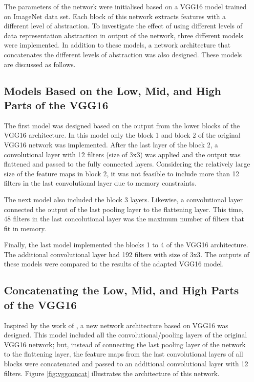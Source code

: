 The parameters of the network were initialised based on a VGG16 model trained on ImageNet data set. Each block of this network extracts features with a different level of abstraction. To investigate the effect of using different levels of data representation abstraction in output of the network, three different models were implemented. In addition to these models, a network architecture that concatenates the different levels of abstraction was also designed. These models are discussed as follows.

\subsection{Models Based on the Low, Mid, and High Parts of the VGG16}

The first model was designed based on the output from the lower blocks of the VGG16 architecture. In this model only the block 1 and block 2 of the original VGG16 network was implemented. After the last layer of the block 2, a convolutional layer with 12 filters (size of 3x3) was applied and the output was flattened and passed to the fully connected layers. Considering the relatively large size of the feature maps in block 2, it was not feasible to include more than 12 filters in the last convolutional layer due to memory constraints. 

The next model also included the block 3 layers. Likewise, a convolutional layer connected the output of the last pooling layer to the flattening layer. This time, 48 filters in the last concolutional layer was the maximum number of filters that fit in memory. 

Finally, the last model implemented the blocks 1 to 4 of the VGG16 architecture. The additional convolutional layer had 192 filters with size of 3x3. The outputs of these models were compared to the results of the adapted VGG16 model.  

\subsection{Concatenating the Low, Mid, and High Parts of the VGG16}

Inspired by the work of \citeauthor*{bansal} \cite{bansal}, a new network architecture based on VGG16 was designed. This model included all the convolutional/pooling layers of the original VGG16 network; but, instead of connecting the last pooling layer of the network to the flattening layer, the feature maps from the last convolutional layers of all blocks were concatenated and passed to an additional convolutional layer with 12 filters. Figure \ref{fig:vggconcat} illustrates the architecture of this network.

